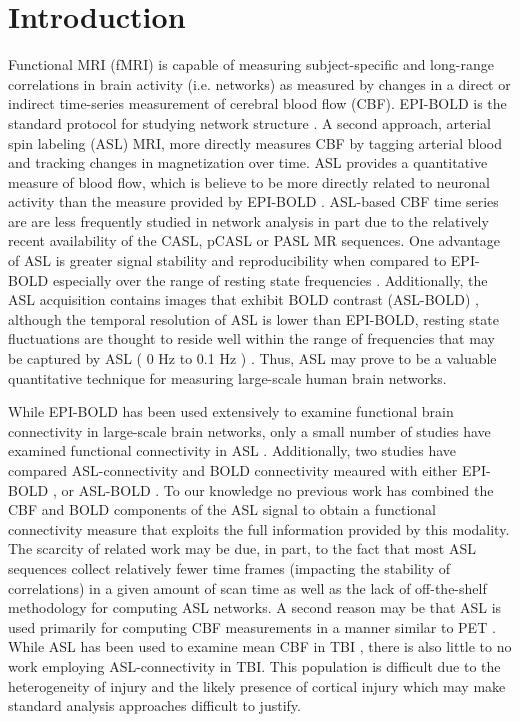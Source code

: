 \documentclass{llncs}
\begin{document}
\section{Introduction}
Functional MRI (fMRI) is capable of measuring subject-specific and long-range correlations in brain activity (i.e. networks) as measured by changes in a direct or indirect time-series measurement of cerebral blood flow (CBF).  EPI-BOLD is the standard protocol for studying network structure \cite{Bullmore2009}.  A second approach, arterial spin labeling (ASL) MRI, more directly measures CBF by tagging arterial blood and tracking changes in magnetization over time. ASL provides a quantitative measure of blood flow, which is believe to be more directly related to neuronal activity than the measure provided by EPI-BOLD \cite{Wong1997}.  ASL-based CBF time series are are less frequently studied in network analysis in part due to the relatively recent availability of the CASL, pCASL or PASL MR sequences.  One advantage of ASL is greater signal stability and reproducibility when compared to EPI-BOLD especially over the range of resting state frequencies \cite{Aguirre2002}.  Additionally, the ASL acquisition contains images that exhibit BOLD contrast (ASL-BOLD) \cite{Wong1997}, although the temporal resolution of ASL is lower than EPI-BOLD, resting state fluctuations are thought to reside well within the range of frequencies that may be captured by ASL ( 0 Hz to 0.1 Hz ) \cite{Cordes2001}.  Thus, ASL may prove to be a valuable quantitative technique for measuring large-scale human brain networks.

While EPI-BOLD has been used extensively to examine functional brain connectivity in large-scale brain networks, only a small number of studies have examined functional connectivity in ASL \cite{Chuang2008,Zou2009}. Additionally, two studies have compared ASL-connectivity and BOLD connectivity meaured with either EPI-BOLD \cite{Li2012}, or ASL-BOLD \cite{Viviani2011}.  To our knowledge no previous work has combined the CBF and BOLD components of the ASL signal to obtain a functional connectivity measure that exploits the full information provided by this modality. The scarcity of related work may be due, in part, to the fact that most ASL sequences collect relatively fewer time frames (impacting the stability of correlations) in a given amount of scan time as well as the lack of off-the-shelf methodology for computing ASL networks.  A second reason may be that ASL is used primarily for computing CBF measurements in a manner similar to PET \cite{Chen2008}.  While ASL has been used to examine mean CBF in TBI \cite{Hart2013}, there is also little to no work employing ASL-connectivity in TBI.   This population is difficult due to the heterogeneity of injury and the likely presence of cortical injury which may make standard analysis approaches difficult to justify. 
\end{document}
